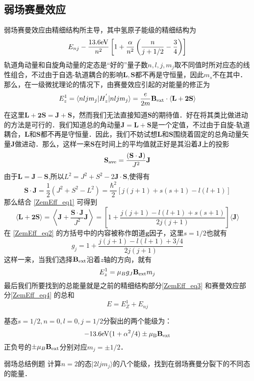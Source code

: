 \subsection{弱场赛曼效应}
弱场赛曼效应由精细结构所主导，其中氢原子能级的精细结构为
\begin{equation}\label{ZemEff_eq3}
E_{nj}-\frac{13.6\rm{eV}}{n^2}\left[1+\frac{\alpha}{n^2}\left(\frac{n}{j+1/2}-\frac{3}{4}\right)\right]
\end{equation}
轨道角动量和自旋角动量的定态是“好的”量子数$n,l,j,m_j$取不同值时所对应态的线性组合，不过由于自选-轨道耦合的影响$\mathbf{L,S}$都不再是守恒量，因此$m_s$不在其中．那么，在一级微扰理论的情况下，由赛曼效应引起的对能量的修正为
$$
E_z^{1}=\langle nljm_j|H_z^{'}|nljm_j\rangle=\frac{e}{2m}\mathbf{B}_{\rm{ext}}\cdot\langle\mathbf{L+2S}\rangle
$$
在这里$\mathbf{L+2S=J+S}$，然而我们无法直接知道$\mathbf{S}$的期待值．好在将其类比做进动的方法是可行的．我们知道总的角动量$\mathbf{J=L+S}$是一个定值，不过由于自旋-轨道耦合，$\mathbf{L}$和$\mathbf{S}$都不再是守恒量．因此，我们不妨试想$\mathbf{L}$和$\mathbf{S}$围绕着固定的总角动量矢量$\mathbf{J}$做进动．那么，这样一来$\mathbf{S}$在时间上的平均值就正好是其沿着$\mathbf{J}$上的投影
\begin{equation}\label{ZemEff_eq1}
\mathbf{S}_{\rm{ave}}=\frac{(\mathbf{S\cdot J})}{J^2}\mathbf{J}
\end{equation}
由于$\mathbf{L=J-S}$,所以$L^2=J^2+S^2-2\mathbf{J\cdot S}$,使得有
\begin{equation}
\mathbf{S\cdot J}=\frac{1}{2}(J^2+S^2-L^2)=\frac{\hbar^2}{2}[j(j+1)+s(s+1)-l(l+1)]
\end{equation}
那么结合 \autoref{ZemEff_eq1} 可得到
\begin{equation}\label{ZemEff_eq2}
\langle \mathbf{L+2S}\rangle =\left\langle \mathbf{J}+\frac{\mathbf{S\cdot J}}{J^2}\mathbf{J}\right\rangle=\left[1+\frac{j(j+1)-l(l+1)+s(s+1)}{2j(j+1)}\right]\langle\mathbf{J}\rangle
\end{equation}
在 \autoref{ZemEff_eq2} 的方括号中的内容被称作朗道$\mathbf{g}$因子，这里$s=1/2$也就有
\begin{equation}
g_j=1+\frac{j(j+1)-l(l+1)+3/4}{2j(j+1)}
\end{equation}
这样一来，当我们选择$\mathbf{B}_{\rm{ext}}$沿着$z$轴的方向，就有
\begin{equation}\label{ZemEff_eq4}
E^1_z =\mu_Bg_J\mathbf{B}_{\rm{ext}}m_j
\end{equation}
最后我们所要找到的总能量就是之前的精细结构部分\autoref{ZemEff_eq3} 和赛曼效应部分\autoref{ZemEff_eq4} 的总和
\begin{equation}
E=E_Z^1+E_{nj}
\end{equation}
\begin{example}{}
基态$s=1/2,n=0,l=0,j=1/2$分裂出的两个能级为：
\begin{equation}
-13.6\rm{eV}(1+\alpha^2/4)\pm\mu_B\mathbf{B}_{\rm{ext}}\notag
\end{equation}
正负号的$\pm\mu_B\mathbf{B}_{\rm{ext}}$分别对应$m_j=\pm1/2$．
\end{example}
\begin{example}{弱场总结例题}
计算$n=2$的态$|2ljm_j\rangle$的八个能级，找到在弱场赛曼分裂下的不同态的能量．
\end{example}
